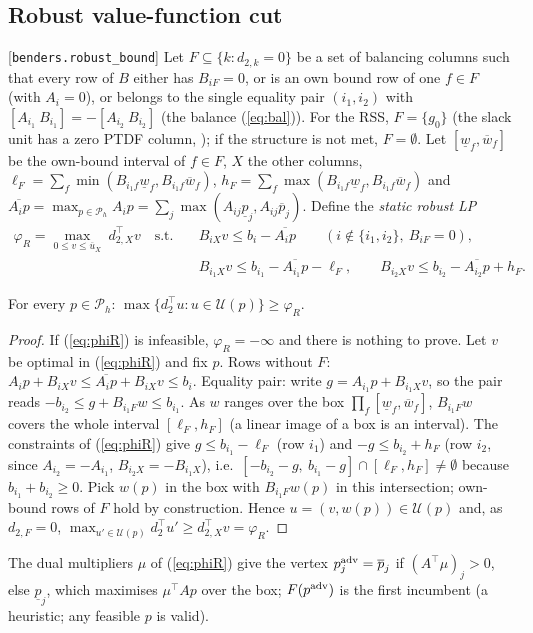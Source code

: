 \subsection{Robust value-function cut}
[\texttt{benders.robust\_bound}] Let $F\subseteq\{k:d_{2,k}=0\}$ be a set of balancing
columns such that every row of $B$ either has $B_{iF}=0$, or is an own bound row of
one $f\in F$ (with $A_i=0$), or belongs to the single equality pair $(i_1,i_2)$ with
$[A_{i_1}\ B_{i_1}]=-[A_{i_2}\ B_{i_2}]$ (the balance (\ref{eq:bal})). For the RSS,
$F=\{g_0\}$ (the slack unit has a zero PTDF column, ); if the
structure is not met, $F=\emptyset$. Let $[\underline w_f,\overline w_f]$ be the own-bound interval of $f\in F$,
$X$ the other columns, $\ell_F=\sum_f\min(B_{i_1f}\underline w_f,B_{i_1f}\overline w_f)$,
$h_F=\sum_f\max(B_{i_1f}\underline w_f,B_{i_1f}\overline w_f)$ and
$\overline{A_ip}=\max_{p\in\mathcal P_h}A_ip=\sum_j\max(A_{ij}\underline p_j,A_{ij}\overline p_j)$. Define the
\emph{static robust LP}
\begin{equation}
\begin{aligned}
\varphi_R=\max_{0\le v\le\overline u_X}\ d_{2,X}^\top v\quad\text{s.t.}\quad
&B_{iX}v\le b_i-\overline{A_ip}\qquad (i\notin\{i_1,i_2\},\ B_{iF}=0),\\
&B_{i_1X}v\le b_{i_1}-\overline{A_{i_1}p}-\ell_F,\qquad
B_{i_2X}v\le b_{i_2}-\overline{A_{i_2}p}+h_F .
\end{aligned}
\label{eq:phiR}
\end{equation}

\begin{lemma}\label{lem:robust}
For every $p\in\mathcal P_h$: $\max\{d_2^\top u:u\in\mathcal U(p)\}\ge\varphi_R$.
\end{lemma}
\begin{proof}
If (\ref{eq:phiR}) is infeasible, $\varphi_R=-\infty$ and there is nothing to prove. Let $v$ be
optimal in (\ref{eq:phiR}) and fix $p$. Rows without $F$: $A_ip+B_{iX}v\le\overline{A_ip}+B_{iX}v\le b_i$.
Equality pair: write $g=A_{i_1}p+B_{i_1X}v$, so the pair reads
$-b_{i_2}\le g+B_{i_1F}w\le b_{i_1}$. As $w$ ranges over the box $\prod_f[\underline w_f,\overline w_f]$,
$B_{i_1F}w$ covers the whole interval $[\ell_F,h_F]$ (a linear image of a box is an interval).
The constraints of (\ref{eq:phiR}) give $g\le b_{i_1}-\ell_F$ (row $i_1$) and
$-g\le b_{i_2}+h_F$ (row $i_2$, since $A_{i_2}=-A_{i_1}$, $B_{i_2X}=-B_{i_1X}$), i.e.\
$[-b_{i_2}-g,\ b_{i_1}-g]\cap[\ell_F,h_F]\neq\emptyset$ because $b_{i_1}+b_{i_2}\ge0$. Pick $w(p)$
in the box with $B_{i_1F}w(p)$ in this intersection; own-bound rows of $F$ hold by
construction. Hence $u=(v,w(p))\in\mathcal U(p)$ and, as $d_{2,F}=0$,
$\max_{u'\in\mathcal U(p)}d_2^\top u'\ge d_{2,X}^\top v=\varphi_R$.
\end{proof}
The dual multipliers $\mu$ of (\ref{eq:phiR}) give the vertex
$p^{\rm adv}_j=\overline p_j$ if $(A^\top\mu)_j>0$, else $\underline p_j$, which maximises $\mu^\top Ap$
over the box; $F(p^{\rm adv})$ is the first incumbent (a heuristic; any feasible $p$ is valid).

